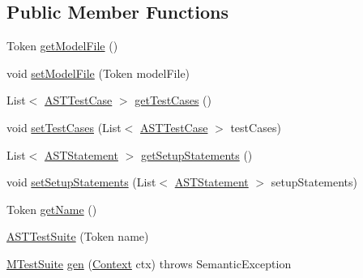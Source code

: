 \subsection*{Public Member Functions}
\begin{DoxyCompactItemize}
\item 
Token \hyperlink{classorg_1_1tzi_1_1use_1_1parser_1_1testsuite_1_1_a_s_t_test_suite_a25bda27ce8a917e2f16e2c128865b090}{get\-Model\-File} ()
\item 
void \hyperlink{classorg_1_1tzi_1_1use_1_1parser_1_1testsuite_1_1_a_s_t_test_suite_a803cd9a1512888cb02271018bbad999c}{set\-Model\-File} (Token model\-File)
\item 
List$<$ \hyperlink{classorg_1_1tzi_1_1use_1_1parser_1_1testsuite_1_1_a_s_t_test_case}{A\-S\-T\-Test\-Case} $>$ \hyperlink{classorg_1_1tzi_1_1use_1_1parser_1_1testsuite_1_1_a_s_t_test_suite_a6e6f1633496d534c53bb5497773426e9}{get\-Test\-Cases} ()
\item 
void \hyperlink{classorg_1_1tzi_1_1use_1_1parser_1_1testsuite_1_1_a_s_t_test_suite_ae5ac80c03c1ff0ea50722c26917d623b}{set\-Test\-Cases} (List$<$ \hyperlink{classorg_1_1tzi_1_1use_1_1parser_1_1testsuite_1_1_a_s_t_test_case}{A\-S\-T\-Test\-Case} $>$ test\-Cases)
\item 
List$<$ \hyperlink{classorg_1_1tzi_1_1use_1_1parser_1_1soil_1_1ast_1_1_a_s_t_statement}{A\-S\-T\-Statement} $>$ \hyperlink{classorg_1_1tzi_1_1use_1_1parser_1_1testsuite_1_1_a_s_t_test_suite_a8035c1295713f7632bfcbed6898c2f4a}{get\-Setup\-Statements} ()
\item 
void \hyperlink{classorg_1_1tzi_1_1use_1_1parser_1_1testsuite_1_1_a_s_t_test_suite_ac0911660ad91a9eae8dcd8f40beb2b63}{set\-Setup\-Statements} (List$<$ \hyperlink{classorg_1_1tzi_1_1use_1_1parser_1_1soil_1_1ast_1_1_a_s_t_statement}{A\-S\-T\-Statement} $>$ setup\-Statements)
\item 
Token \hyperlink{classorg_1_1tzi_1_1use_1_1parser_1_1testsuite_1_1_a_s_t_test_suite_acbfa6d627cd9cad939cf3267c24e332a}{get\-Name} ()
\item 
\hyperlink{classorg_1_1tzi_1_1use_1_1parser_1_1testsuite_1_1_a_s_t_test_suite_ac95a4aef5e7b2ca03d57640c0e83e69f}{A\-S\-T\-Test\-Suite} (Token name)
\item 
\hyperlink{classorg_1_1tzi_1_1use_1_1uml_1_1sys_1_1testsuite_1_1_m_test_suite}{M\-Test\-Suite} \hyperlink{classorg_1_1tzi_1_1use_1_1parser_1_1testsuite_1_1_a_s_t_test_suite_a6362803877bab9a8326c2dc7a0a95ca8}{gen} (\hyperlink{classorg_1_1tzi_1_1use_1_1parser_1_1_context}{Context} ctx)  throws Semantic\-Exception 
\end{DoxyCompactItemize}


